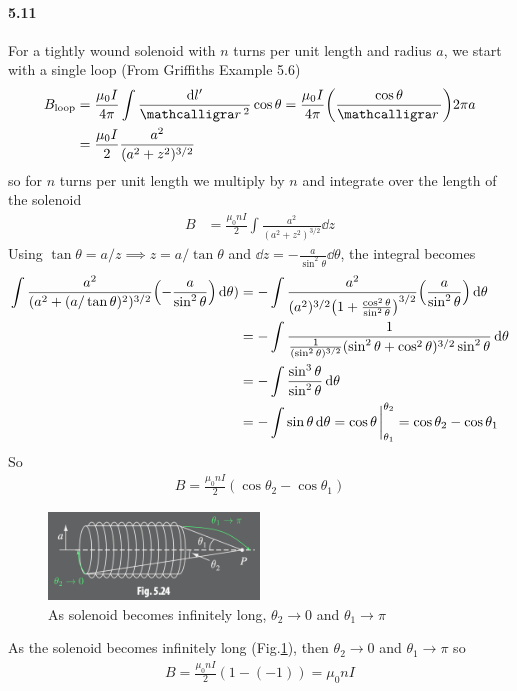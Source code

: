 \documentclass[../main.tex]{subfiles}
\begin{document}
\newpage
\paragraph{5.11} For a tightly wound solenoid with $n$ turns per unit length and radius $a$, we start with a single loop (From Griffiths Example 5.6)
\begin{align*}
    B_\text{loop} &= \frac{\mu_0 I}{4\pi} \int \frac{\dd{l'}}{\scriptr^2} \cos\theta = \frac{\mu_0 I}{4\pi} \qt(\frac{\cos\theta}{\scriptr}) 2 \pi a \\
    &= \frac{\mu_0 I}{2} \frac{a^2}{(a^2 + z^2)^{3/2}}
\end{align*}
so for $n$ turns per unit length we multiply by $n$ and integrate over the length of the solenoid
\begin{align*}
    B &= \frac{\mu_0 n I}{2} \int \frac{a^2}{(a^2 + z^2)^{3/2}} \dd{z}
\end{align*}
Using $\tan\theta = a/z \implies z = a / \tan\theta$ and $\dd{z} = - \frac{a}{\sin^2\theta}\dd{\theta}$, the integral becomes
\begin{align*}
    \int \frac{a^2}{(a^2 + (a/\tan\theta)^2)^{3/2}} \qt(-\frac{a}{\sin^2\theta}) \dd{\theta}) &= -\int \frac{a^2}{(a^2)^{3/2} \qt(1 + \frac{\cos^2\theta}{\sin^2\theta})^{3/2}} \qt(\frac{a}{\sin^2\theta}) \dd{\theta} \\
    &= -\int \frac{1}{\frac{1}{(\sin^2\theta)^{3/2}} (\sin^2\theta + \cos^2\theta)^{3/2} \sin^2\theta} \dd{\theta} \\
    &= - \int \frac{\sin^3\theta}{\sin^2\theta} \dd{\theta} \\
    &= - \int \sin\theta \dd{\theta} = \cos\theta \eval_{\theta_1}^{\theta_2} = \cos\theta_2 - \cos\theta_1
\end{align*}
So
\begin{align*}
    \boxed{
        B = \frac{\mu_0 n I}{2} (\cos\theta_2 - \cos\theta_1)
    }
\end{align*}
\begin{figure}[ht]
    \centering
    \includegraphics[width=0.5\textwidth]{hw8_3.png}
    \caption{As solenoid becomes infinitely long, $\theta_2 \to 0$ and $\theta_1 \to \pi$}
    \label{fig:hw8_3}
\end{figure}

As the solenoid becomes infinitely long (Fig.\ref{fig:hw8_3}), then $\theta_2 \to 0$ and $\theta_1 \to \pi$ so
\begin{align*}
    B = \frac{\mu_0 n I}{2} (1 - (-1)) = \boxed{\mu_0 n I}
\end{align*}
\end{document}
